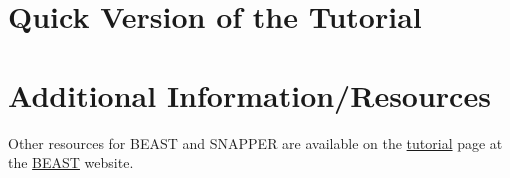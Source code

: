 \documentclass{article}
\newcommand{\program}[1]{#1\xspace}
\newcommand{\beast}{\href{http://beast2.org}{\program{BEAST}}\xspace}
\begin{document}
\newpage
\section{Quick Version of the Tutorial}
\setcounter{stepCounter}{0}
\renewcommand{\step}[2]{\addtocounter{stepCounter}{1} {\bf \hyperlink{step\arabic{stepCounter}}{Step \arabic{stepCounter}}:}\xspace #1\par}
\renewcommand{\intermediate}[1]{}


\newpage
\section{Additional Information/Resources}
Other resources for BEAST and SNAPPER are available on the \href{http://beast2.org/tutorials}{tutorial} page at the \beast website.

\newpage

\end{document}
